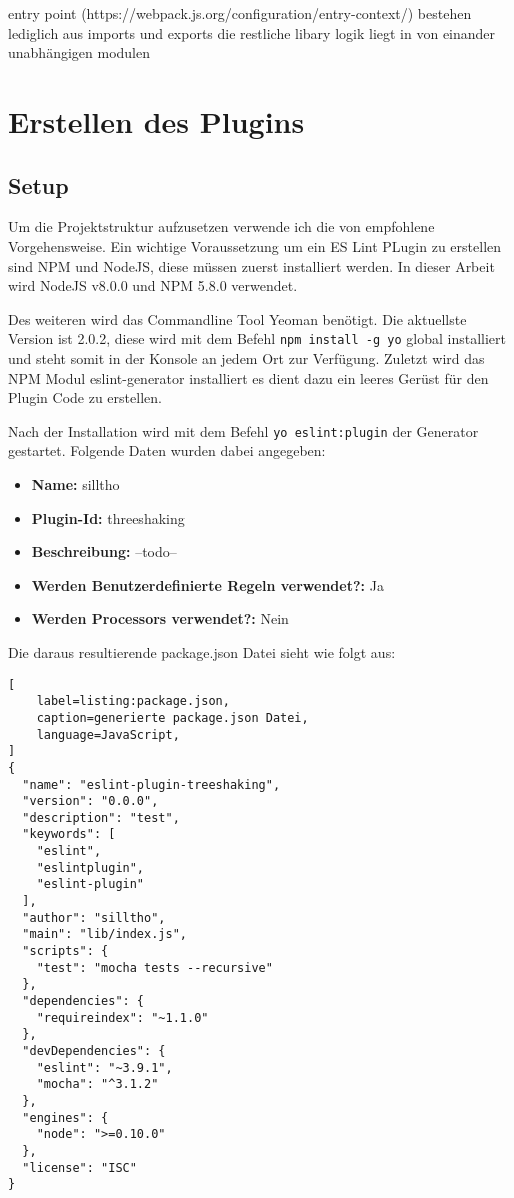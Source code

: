 entry point (https://webpack.js.org/configuration/entry-context/) bestehen lediglich aus imports und exports
die restliche libary logik liegt in von einander unabhängigen modulen



\section{Erstellen des Plugins}
\subsection{Setup}
Um die Projektstruktur aufzusetzen verwende ich die von \textcite{ESLintNewRules} empfohlene Vorgehensweise. Ein wichtige Voraussetzung um ein ES Lint PLugin zu erstellen sind NPM und NodeJS, diese müssen zuerst installiert werden. In dieser Arbeit wird NodeJS v8.0.0 und NPM 5.8.0 verwendet.

Des weiteren wird das Commandline Tool Yeoman benötigt. Die aktuellste Version ist 2.0.2, diese wird mit dem Befehl \lstinline{npm install -g yo} global installiert und steht somit in der Konsole an jedem Ort zur Verfügung. Zuletzt wird das NPM Modul eslint-generator installiert es dient dazu ein leeres Gerüst für den Plugin Code zu erstellen.

Nach der Installation wird mit dem Befehl \lstinline{yo eslint:plugin} der Generator gestartet. Folgende Daten wurden dabei angegeben:
\begin{itemize}
	\item \textbf{Name:} silltho
    \item \textbf{Plugin-Id:} threeshaking
    \item \textbf{Beschreibung:} --todo--
    \item \textbf{Werden Benutzerdefinierte Regeln verwendet?:} Ja
    \item \textbf{Werden Processors verwendet?:} Nein
\end{itemize}

Die daraus resultierende package.json Datei sieht wie folgt aus:

\begin{lstlisting}[
    label=listing:package.json,
	caption=generierte package.json Datei,
	language=JavaScript,
]
{
  "name": "eslint-plugin-treeshaking",
  "version": "0.0.0",
  "description": "test",
  "keywords": [
    "eslint",
    "eslintplugin",
    "eslint-plugin"
  ],
  "author": "silltho",
  "main": "lib/index.js",
  "scripts": {
    "test": "mocha tests --recursive"
  },
  "dependencies": {
    "requireindex": "~1.1.0"
  },
  "devDependencies": {
    "eslint": "~3.9.1",
    "mocha": "^3.1.2"
  },
  "engines": {
    "node": ">=0.10.0"
  },
  "license": "ISC"
}
\end{lstlisting}

